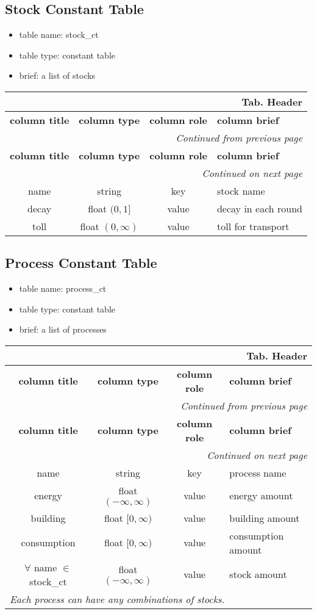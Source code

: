 \documentclass[a4paper,oneside,titlepage]{report}
\newcommand*{\LTHeaderIV}[5]{
  \multicolumn{4}{r}{\textbf{Tab. \thesubsection} \textbf{#1}}\\    
  \hline
  \textbf{#2} & \textbf{#3} & \textbf{#4} & \textbf{#5}\\
  \hline
  
  \endfirsthead
  \multicolumn{4}{r}{\textit{Continued from previous page}}\\    
  \hline
  \textbf{#2} & \textbf{#3} & \textbf{#4} & \textbf{#5}\\
  \hline
  \endhead
  \hline
  \multicolumn{4}{r}{\textit{Continued on next page}}\\
  \endfoot
  \hline
  \endlastfoot  
}
\begin{document}
\subsection{Stock Constant Table}
\begin{itemize}
  \setlength{\itemsep}{0pt}
  \setlength{\parskip}{0pt}
\item table name: stock\_ct  
\item table type: constant table   
\item brief: a list of stocks
\end{itemize}

\vspace{-0.5cm}
\begin{longtable}{ |c|c|c|l| } 
  \LTHeaderIV{Header}{column title}{column type}{column role}{column brief} 
  name & string & key & stock name\\
  decay & float $(0, 1]$ & value & decay in each round\\
  toll & float $(0, \infty)$ & value & toll for transport\\
\end{longtable}        

\subsection{Process Constant Table}
\begin{itemize}
  \setlength{\itemsep}{0pt}
  \setlength{\parskip}{0pt}
\item table name: process\_ct  
\item table type: constant table   
\item brief: a list of processes
\end{itemize}

\vspace{-0.5cm}
\begin{longtable}{ |c|c|c|l| } 
  \LTHeaderIV{Header}{column title}{column type}{column role}{column brief}                    
  name & string & key & process name\\
  energy & float $(-\infty, \infty)$ & value & energy amount \\
  building & float $[0, \infty)$ & value & building  amount \\
  consumption & float $[0, \infty)$ & value & consumption amount \\
  $\forall$ name $\in$ stock\_ct & float $(-\infty, \infty)$ & value & stock amount\\
  \multicolumn{4}{|l|}{\textit{Each process can have any combinations of stocks.}}\\
\end{longtable}        
\end{document}
